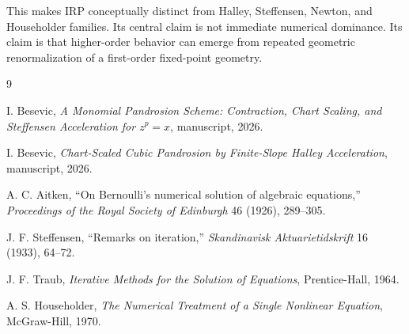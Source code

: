 \documentclass[11pt]{article}
\begin{document}
This makes IRP conceptually distinct from Halley, Steffensen, Newton, and Householder families.  Its central claim is not immediate numerical dominance.  Its claim is that higher-order behavior can emerge from repeated geometric renormalization of a first-order fixed-point geometry.

\begin{thebibliography}{9}

I. Besevic, \emph{A Monomial Pandrosion Scheme: Contraction, Chart Scaling, and Steffensen Acceleration for $z^p=x$}, manuscript, 2026.

I. Besevic, \emph{Chart-Scaled Cubic Pandrosion by Finite-Slope Halley Acceleration}, manuscript, 2026.

A. C. Aitken, ``On Bernoulli's numerical solution of algebraic equations,'' \emph{Proceedings of the Royal Society of Edinburgh} 46 (1926), 289--305.

J. F. Steffensen, ``Remarks on iteration,'' \emph{Skandinavisk Aktuarietidskrift} 16 (1933), 64--72.

J. F. Traub, \emph{Iterative Methods for the Solution of Equations}, Prentice-Hall, 1964.

A. S. Householder, \emph{The Numerical Treatment of a Single Nonlinear Equation}, McGraw-Hill, 1970.

\end{thebibliography}
\end{document}
